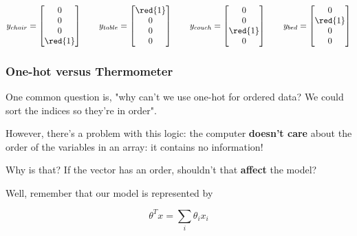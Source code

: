             \begin{equation}
                y_{chair} = 
                \begin{bmatrix}
                  0\\0\\0\\ \red{1}
                \end{bmatrix}
                \qquad
                y_{table} = 
                \begin{bmatrix}
                  \red{1}\\0\\0\\0
                \end{bmatrix}
                \qquad
                y_{couch} = 
                \begin{bmatrix}
                  0\\0\\\red{1}\\0
                \end{bmatrix}
                \qquad
                y_{bed} = 
                \begin{bmatrix}
                  0\\\red{1}\\0\\0
                \end{bmatrix}
            \end{equation}

            \subsecdiv
            \subsubsection*{One-hot versus Thermometer}

                One common question is, "why can't we use one-hot for ordered data? We could sort the indices so they're in order".

                However, there's a problem with this logic: the computer \textbf{doesn't care} about the order of the variables in an array: it contains no information!

                Why is that? If the vector has an order, shouldn't that \textbf{affect} the model?
                
                Well, remember that our model is represented by 

                \begin{equation}
                    \theta^T x = \sum_i \theta_i x_i
                \end{equation}

